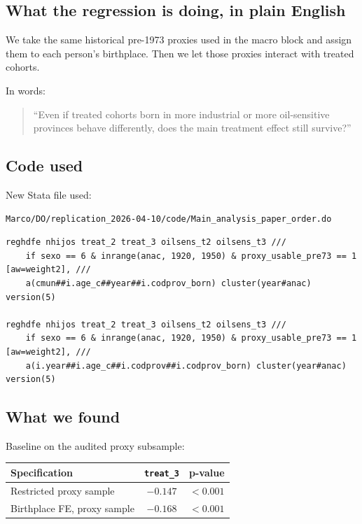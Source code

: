 \documentclass[11pt]{article}
\begin{document}
\subsection*{What the regression is doing, in plain English}

We take the same historical pre-1973 proxies used in the macro block and assign them to each person's birthplace. Then we let those proxies interact with treated cohorts.

In words:

\begin{quote}
``Even if treated cohorts born in more industrial or more oil-sensitive provinces behave differently, does the main treatment effect still survive?''
\end{quote}

\subsection*{Code used}

New Stata file used:

\begin{verbatim}
Marco/DO/replication_2026-04-10/code/Main_analysis_paper_order.do
\end{verbatim}

\begin{verbatim}
reghdfe nhijos treat_2 treat_3 oilsens_t2 oilsens_t3 ///
    if sexo == 6 & inrange(anac, 1920, 1950) & proxy_usable_pre73 == 1 [aw=weight2], ///
    a(cmun##i.age_c##year##i.codprov_born) cluster(year#anac) version(5)

reghdfe nhijos treat_2 treat_3 oilsens_t2 oilsens_t3 ///
    if sexo == 6 & inrange(anac, 1920, 1950) & proxy_usable_pre73 == 1 [aw=weight2], ///
    a(i.year##i.age_c##i.codprov##i.codprov_born) cluster(year#anac) version(5)
\end{verbatim}

\subsection*{What we found}

Baseline on the audited proxy subsample:

\begin{center}
\begin{tabular}{lcc}
\toprule
Specification & \texttt{treat\_3} & p-value \\
\midrule
Restricted proxy sample & $-0.147$ & $< 0.001$ \\
Birthplace FE, proxy sample & $-0.168$ & $< 0.001$ \\
\bottomrule
\end{tabular}
\end{center}
\end{document}
